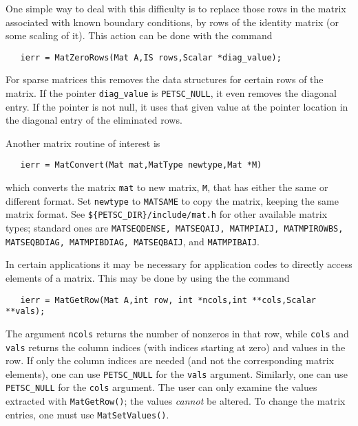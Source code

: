 One simple way to deal with this difficulty is to replace those rows in the 
matrix associated with known boundary conditions, by rows of the 
identity matrix (or some scaling of it). This action can be done with 
the command 
\begin{verbatim}
   ierr = MatZeroRows(Mat A,IS rows,Scalar *diag_value);
\end{verbatim}
For sparse matrices this removes the data structures for certain rows 
of the matrix. If the pointer {\tt diag\_value} is {\tt PETSC\_NULL}, it 
even removes the diagonal entry. If the pointer is not null, it uses that 
given value at the pointer location 
in the diagonal entry of the eliminated rows. 


Another matrix routine of interest is 
\begin{verbatim}
   ierr = MatConvert(Mat mat,MatType newtype,Mat *M)
\end{verbatim}
which converts the matrix {\tt mat} to new matrix, {\tt M}, that has
either the same or different format.  Set {\tt newtype} to {\tt MATSAME}
to copy the matrix, keeping the same matrix format.  See 
{\tt \$\{PETSC\_DIR\}/include/mat.h} for other available matrix types;
standard ones are {\tt MATSEQDENSE, MATSEQAIJ,   MATMPIAIJ,  
               MATMPIROWBS, MATSEQBDIAG, MATMPIBDIAG,  MATSEQBAIJ}, and
               {\tt MATMPIBAIJ}.

In certain applications it may be necessary for application codes
to directly access elements of a matrix. This may be done by using the 
the command 
\begin{verbatim}
   ierr = MatGetRow(Mat A,int row, int *ncols,int **cols,Scalar **vals);
\end{verbatim}
The argument {\tt ncols} returns the number of nonzeros in that row, 
while {\tt cols} and {\tt vals} returns the column indices (with indices
starting at zero) and values in the row. If only the column 
indices are needed (and not the corresponding matrix elements), one
can use {\tt PETSC\_NULL} for the {\tt vals} argument. Similarly,
one can use {\tt PETSC\_NULL} for the {\tt cols} argument.
The user can only examine the values extracted with {\tt MatGetRow()};
the values {\em cannot} be altered. 
 
To change the matrix entries, one must use {\tt MatSetValues()}.

